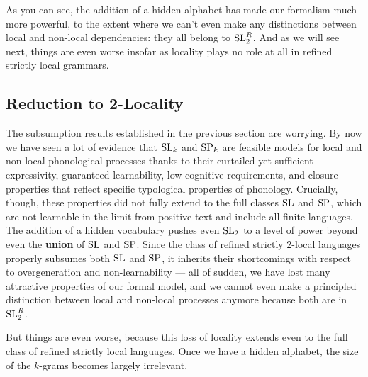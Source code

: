 As you can see, the addition of a hidden alphabet has made our formalism much more powerful, to the extent where we can't even make any distinctions between local and non-local dependencies: they all belong to $\mathrm{SL}_2^R$.
And as we will see next, things are even worse insofar as locality plays no role at all in refined strictly local grammars.


\subsection{Reduction to 2-Locality}

The subsumption results established in the previous section are worrying.
By now we have seen a lot of evidence that $\mathrm{SL}_k$ and $\mathrm{SP}_k$ are feasible models for local and non-local phonological processes thanks to their curtailed yet sufficient expressivity, guaranteed learnability, low cognitive requirements, and closure properties that reflect specific typological properties of phonology.
Crucially, though, these properties did not fully extend to the full classes $\mathrm{SL}$ and $\mathrm{SP}$, which are not learnable in the limit from positive text and include all finite languages.
The addition of a hidden vocabulary pushes even $\mathrm{SL}_2$ to a level of power beyond even the \textbf{union} of $\mathrm{SL}$ and $\mathrm{SP}$.
Since the class of refined strictly $2$-local languages properly subsumes both $\mathrm{SL}$ and $\mathrm{SP}$, it inherits their shortcomings with respect to overgeneration and non-learnability --- all of sudden, we have lost many attractive properties of our formal model, and we cannot even make a principled distinction between local and non-local processes anymore because both are in $\mathrm{SL}_2^R$.

But things are even worse, because this loss of locality extends even to the full class of refined strictly local languages.
Once we have a hidden alphabet, the size of the $k$-grams becomes largely irrelevant.

